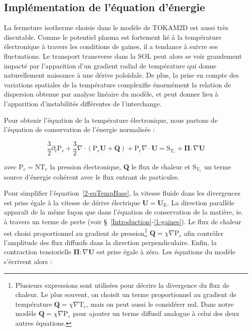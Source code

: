 \begin{refsection}
	\subsection{Implémentation de l'équation d'énergie}
	La fermeture isotherme choisie dans le modèle de TOKAM2D est aussi très
	discutable. Comme le potentiel plasma est fortement lié à la température
	électronique à travers les conditions de gaines, il a tendance à suivre ses
	fluctuations. Le transport transverse dans la SOL peut alors se voir grandement
	impacté par l'apparition d'un gradient radial de température qui donne
	naturellement naissance à une dérive poloïdale. De plus, la prise en compte des
	variations spatiales de la température complexifie énormément la relation de
	dispersion obtenue par analyse linéaire du modèle, et peut donner lieu à
	l'apparition d'instabilités différentes de l'interchange.
	
	Pour obtenir l'équation de la température électronique, nous partons de
	l'équation de conservation de l'énergie normalisée :
	
	\begin{equation} 
	\label{2-eqTempBase}
		\frac{3}{2}\partial_t \text{P}_e +
		\frac{3}{2}\nabla\cdot\left(\text{P}_e\mathbf{U}+\mathbf{Q}\right) +
		\text{P}_e\nabla\cdot\mathbf{U}=\text{S}_{\text{T}_e} +
		\mathbf{\Pi}:\nabla \mathbf U
	\end{equation}
	
	avec $\text{P}_e=\text{NT}_e$ la pression électronique, $\mathbf{Q}$ le
	flux de chaleur et $\text{S}_{\text{T}_e}$ un terme source d'énergie cohérent
	avec le flux entrant de particules. 
	
	Pour simplifier l'équation~\ref{2-eqTempBase}, la vitesse
	fluide dans les divergences est prise égale à la vitesse de dérive électrique $\mathbf
	U=\mathbf U_\text{E}$. La direction parallèle apparaît de la même façon que
	dans l'équation de conservation de la matière, ie. à travers un terme de
	perte (voir \S~\ref{Introduction}-\ref{1-gaines}). Le flux de chaleur est
	choisi proportionnel au gradient de pression\footnote{Plusieurs expressions
	sont utilisées pour décrire la divergence du flux de chaleur. Le plus souvent,
	on choisit un terme proportionnel au gradient de température 
$\mathbf{Q}=\chi\nabla\text{T}_e$, mais on peut aussi le considérer nul. Dans
notre modèle $\mathbf{Q}=\chi\nabla\text{P}_e$ pour ajouter un terme diffusif
analogue à celui des deux autres équations.} $\mathbf{Q}=\chi\nabla\text{P}_e$
afin contrôler l'amplitude des flux diffusifs dans la direction perpendiculaire.
	Enfin, la contraction tensiorielle $\mathbf{\Pi}:\nabla \mathbf U$ est
	prise égale à zéro. Les équations du modèle s'écrivent alors :
	

\end{refsection}
